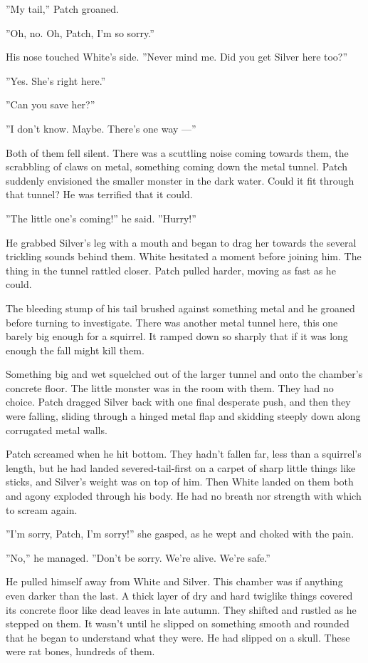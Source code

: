 \documentclass[12pt]{book}
\begin{document}
''My tail,'' Patch groaned.

''Oh, no. Oh, Patch, I'm so sorry.''

His nose touched White's side. ''Never mind me. Did you get Silver
here too?''

''Yes. She's right here.''

''Can you save her?''

''I don't know. Maybe. There's one way ---''

Both of them fell silent. There was a scuttling noise coming towards
them, the scrabbling of claws on metal, something coming down the
metal tunnel. Patch suddenly envisioned the smaller monster in the
dark water. Could it fit through that tunnel? He was terrified that it
could.

''The little one's coming!'' he said. ''Hurry!''

He grabbed Silver's leg with a mouth and began to drag her towards the
several trickling sounds behind them. White hesitated a moment before
joining him. The thing in the tunnel rattled closer. Patch pulled
harder, moving as fast as he could.

The bleeding stump of his tail brushed against something metal and he
groaned before turning to investigate. There was another metal tunnel
here, this one barely big enough for a squirrel. It ramped down so
sharply that if it was long enough the fall might kill them.

Something big and wet squelched out of the larger tunnel and onto the
chamber's concrete floor. The little monster was in the room with
them. They had no choice. Patch dragged Silver back with one final
desperate push, and then they were falling, sliding through a hinged
metal flap and skidding steeply down along corrugated metal walls.

Patch screamed when he hit bottom. They hadn't fallen far, less than a
squirrel's length, but he had landed severed-tail-first on a carpet of
sharp little things like sticks, and Silver's weight was on top of
him. Then White landed on them both and agony exploded through his
body. He had no breath nor strength with which to scream again.

''I'm sorry, Patch, I'm sorry!'' she gasped, as he wept and choked
with the pain.

''No,'' he managed. ''Don't be sorry. We're alive. We're safe.''

He pulled himself away from White and Silver. This chamber was if
anything even darker than the last. A thick layer of dry and hard
twiglike things covered its concrete floor like dead leaves in late
autumn. They shifted and rustled as he stepped on them. It wasn't
until he slipped on something smooth and rounded that he began to
understand what they were. He had slipped on a skull. These were rat
bones, hundreds of them.
\end{document}
